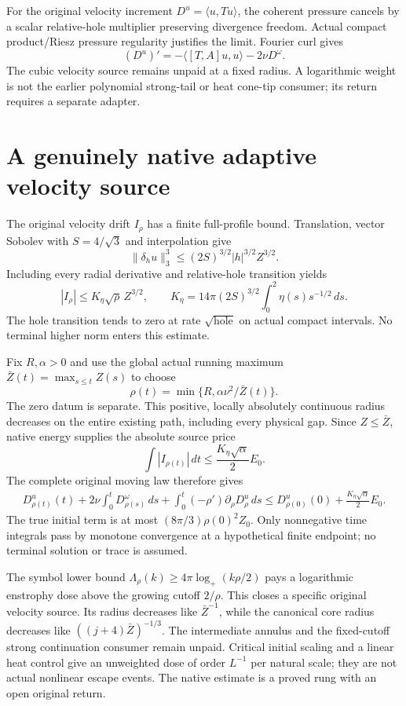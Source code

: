 \documentclass[11pt]{article}
\begin{document}
For the original velocity increment $D^u=\langle u,Tu\rangle$,
the coherent pressure cancels by a scalar relative-hole multiplier
preserving divergence freedom. Actual compact product/Riesz pressure
regularity justifies the limit. Fourier curl gives
\[
 (D^u)'=-\langle[T,A]u,u\rangle-2\nu D^\omega.
\]
The cubic velocity source remains unpaid at a fixed radius. A logarithmic
weight is not the earlier polynomial strong-tail or heat cone-tip
consumer; its return requires a separate adapter.

\section{A genuinely native adaptive velocity source}
The original velocity drift $I_\rho$ has a finite full-profile bound.
Translation, vector Sobolev with $S=4/\sqrt3$ and interpolation give
\[
 \|\delta_hu\|_3^3\le(2S)^{3/2}|h|^{3/2}Z^{3/2}.
\]
Including every radial derivative and relative-hole transition yields
\[
 |I_\rho|\le K_\eta\sqrt\rho\,Z^{3/2},\qquad
 K_\eta=14\pi(2S)^{3/2}\int_0^2\eta(s)s^{-1/2}\,ds.
\]
The hole transition tends to zero at rate $\sqrt{\text{hole}}$ on
actual compact intervals. No terminal higher norm enters this estimate.

Fix $R,\alpha>0$ and use the global actual running maximum
$\bar Z(t)=\max_{s\le t}Z(s)$ to choose
\[
 \rho(t)=\min\{R,\alpha\nu^2/\bar Z(t)\}.
\]
The zero datum is separate. This positive, locally absolutely continuous
radius decreases on the entire existing path, including every physical
gap. Since $Z\le\bar Z$, native energy supplies the absolute source price
\[
 \int|I_{\rho(t)}|\,dt\le\frac{K_\eta\sqrt\alpha}{2}E_0.
\]
The complete original moving law therefore gives
\[
 \begin{split}
 D^u_{\rho(t)}(t)+2\nu\int_0^tD^\omega_{\rho(s)}\,ds
   +\int_0^t(-\rho')\partial_\rho D^u_\rho\,ds
 \le D^u_{\rho(0)}(0)+\frac{K_\eta\sqrt\alpha}{2}E_0.
 \end{split}
\]
The true initial term is at most $(8\pi/3)\rho(0)^2Z_0$.
Only nonnegative time integrals pass by monotone convergence at a
hypothetical finite endpoint; no terminal solution or trace is assumed.

The symbol lower bound $\Lambda_\rho(k)\ge4\pi\log_+(k\rho/2)$
pays a logarithmic enstrophy dose above the growing cutoff $2/\rho$.
This closes a specific original velocity source. Its radius decreases
like $\bar Z^{-1}$, while the canonical core radius decreases like
$((j+4)\bar Z)^{-1/3}$. The intermediate annulus and the fixed-cutoff
strong continuation consumer remain unpaid. Critical initial scaling
and a linear heat control give an unweighted dose of order $L^{-1}$
per natural scale; they are not actual nonlinear escape events.
The native estimate is a proved rung with an open original return.
\end{document}
